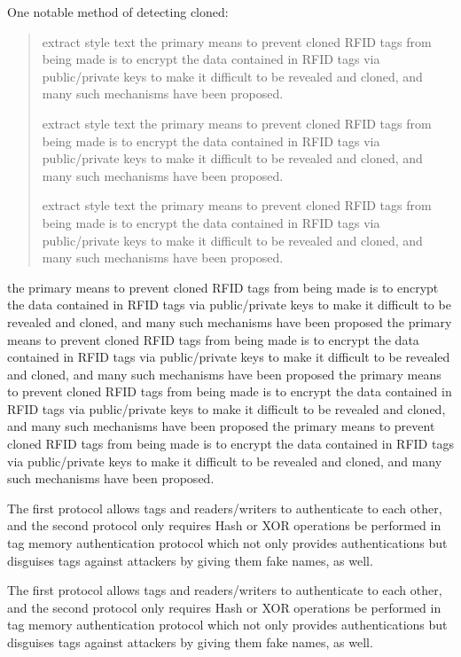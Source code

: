\documentclass[10pt]{ietbook}
\begin{document}
One notable method of detecting cloned:
\begin{quote}
extract style text the primary means to prevent cloned RFID tags from being made is to
encrypt the data contained in RFID tags via public/private keys to make
it difficult to be revealed and cloned, and many such mechanisms have
been proposed.

extract style text the primary means to prevent cloned RFID tags from being made is to
encrypt the data contained in RFID tags via public/private keys to make
it difficult to be revealed and cloned, and many such mechanisms have
been proposed.

extract style text the primary means to prevent cloned RFID tags from being made is to
encrypt the data contained in RFID tags via public/private keys to make
it difficult to be revealed and cloned, and many such mechanisms have been proposed.
\end{quote}
the primary means to prevent cloned RFID tags from being made is to
encrypt the data contained in RFID tags via public/private keys to make
it difficult to be revealed and cloned, and many such mechanisms have
been proposed the primary means to prevent cloned RFID tags from being made is to
encrypt the data contained in RFID tags via public/private keys to make
it difficult to be revealed and cloned, and many such mechanisms have
been proposed the primary means to prevent cloned RFID tags from being made is to
encrypt the data contained in RFID tags via public/private keys to make
it difficult to be revealed and cloned, and many such mechanisms have
been proposed the primary means to prevent cloned RFID tags from being made is to
encrypt the data contained in RFID tags via public/private keys to make
it difficult to be revealed and cloned, and many such mechanisms have
been proposed.

The first protocol allows tags and readers/writers to authenticate to\cite{uniform} 
each other, and the second protocol only requires Hash or XOR operations\cite{bibliographic}
be performed in tag memory authentication protocol which not only\cite{halpern.ubel.ea:solid-organ*2} 
provides authentications but disguises tags against attackers by giving\cite{halpern.ubel.ea:solid-organ}
them fake names, as well.\cite{halpern.ubel.ea:solid-organ*1}

The first protocol allows tags and readers/writers to authenticate to\cite{rose.huerbin.ea:regulation}
each other, and the second protocol only requires Hash or XOR operations\cite{hypertension}
be performed in tag memory authentication protocol which not only\cite{vallancien.emberton.ea:sexual}
provides authentications but disguises tags against attackers by giving\cite{21st}
them fake names, as well.\cite{ellingsen.wilhelmsen:sykdomsangst}



\end{document}

